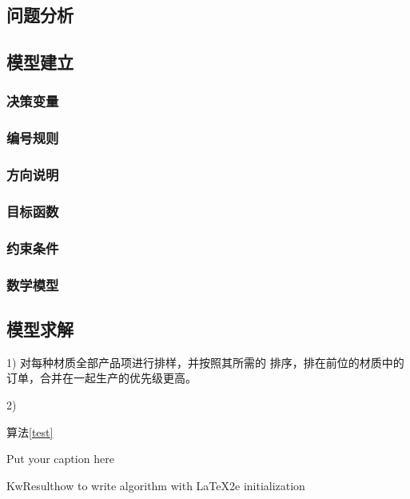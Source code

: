 \documentclass[bwprint]{gmcmthesis}
\begin{document}
\subsection{问题分析}

\subsection{模型建立}

\subsubsection{决策变量}

\subsubsection{编号规则}

\subsubsection{方向说明}

\subsubsection{目标函数}

\subsubsection{约束条件}

\subsubsection{数学模型}

\subsection{模型求解}
1) 对每种材质全部产品项进行排样，并按照其所需的  排序，排在前位的材质中的订单，合并在一起生产的优先级更高。

2) 

算法\ref{test}
\begin{algorithm}
    \caption{Put your caption here}\label{test}
    \begin{multicols}{2}
        \SetAlgoLined
        KwResult{how to write algorithm with \LaTeX2e }
        initialization\;
    \end{multicols}
\end{algorithm}
\end{document}
